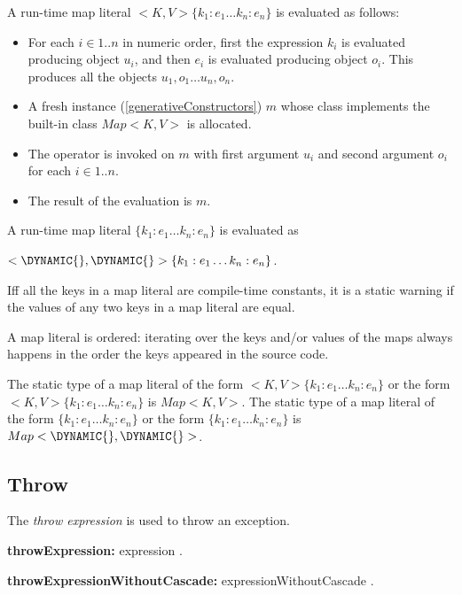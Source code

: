 \documentclass{article}
\begin{document}
\LMHash{}
A run-time map literal $<K, V>\{k_1:e_1\ldots k_n :e_n\}$ is evaluated as follows:
\begin{itemize}
\item
For each $i \in 1 .. n$ in numeric order,
first the expression $k_i$ is evaluated producing object $u_i$,
and then $e_i$ is evaluated producing object $o_i$.
This produces all the objects $u_1, o_1\ldots u_n, o_n$.
\item A fresh instance (\ref{generativeConstructors}) $m$ whose class implements the built-in class $Map<K, V>$ is allocated.
\item
The operator \code{[]=} is invoked on $m$ with first argument $u_i$ and second argument $o_i$ for each $i \in 1 .. n$.
\item
The result of the evaluation is $m$.
\end{itemize}

\LMHash{}
A run-time map literal $\{k_1:e_1\ldots k_n :e_n\}$ is evaluated as

$<\DYNAMIC{}, \DYNAMIC{}>\{k_1:e_1\ldots k_n :e_n\}$.

\LMHash{}
If{}f all the keys in a map literal are compile-time constants, it is a static warning if the values of any two keys in a map literal are equal.

\LMHash{}
A map literal is ordered: iterating over the keys and/or values of the maps always happens in the
 order the keys appeared in the source code.


\LMHash{}
The static type of a map literal of the form \CONST{}$ <K, V>\{k_1:e_1\ldots k_n :e_n\}$ or the form $<K, V>\{k_1:e_1\ldots k_n :e_n\}$ is $Map<K, V>$.
The static type of a map literal of the form \CONST{}$\{k_1:e_1\ldots k_n :e_n\}$ or the form $\{k_1:e_1\ldots k_n :e_n\}$ is $Map<\DYNAMIC{}, \DYNAMIC{}>$.


\subsection{Throw}

\LMHash{}
The {\em throw expression} is used to throw an exception.

\begin{grammar}
{\bf throwExpression:}\THROW{} expression
  .

{\bf throwExpressionWithoutCascade:}\THROW{} expressionWithoutCascade
  .
\end{grammar}
\end{document}
